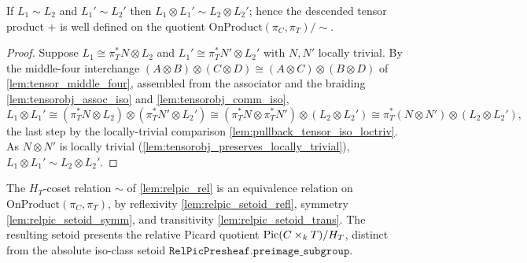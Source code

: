 \begin{lemma}\leanok
  \label{lem:relpic_add_welldef}
  If \(L_1 \sim L_2\) and \(L_1' \sim L_2'\) then
  \(L_1 \otimes L_1' \sim L_2 \otimes L_2'\); hence the descended tensor product
  \(+\) is well defined on the quotient
  \(\mathrm{OnProduct}(\pi_C, \pi_T) / {\sim}\).
\end{lemma}

\begin{proof}
  Suppose \(L_1 \cong \pi_T^* N \otimes L_2\) and
  \(L_1' \cong \pi_T^* N' \otimes L_2'\) with \(N, N'\) locally trivial. By the
  middle-four interchange
  \((A \otimes B) \otimes (C \otimes D) \cong (A \otimes C) \otimes (B \otimes D)\)
  of \cref{lem:tensor_middle_four}, assembled from the associator and the
  braiding \cref{lem:tensorobj_assoc_iso} and \cref{lem:tensorobj_comm_iso},
  \[
    L_1 \otimes L_1'
      \cong (\pi_T^* N \otimes L_2) \otimes (\pi_T^* N' \otimes L_2')
      \cong (\pi_T^* N \otimes \pi_T^* N') \otimes (L_2 \otimes L_2')
      \cong \pi_T^*(N \otimes N') \otimes (L_2 \otimes L_2') ,
  \]
  the last step by the locally-trivial comparison
  \cref{lem:pullback_tensor_iso_loctriv}. As \(N \otimes N'\) is locally
  trivial (\cref{lem:tensorobj_preserves_locally_trivial}),
  \(L_1 \otimes L_1' \sim L_2 \otimes L_2'\).
\leanok
\end{proof}

\begin{definition}\leanok
  \label{lem:relpic_setoid}
  The \(H_T\)-coset relation \(\sim\) of \cref{lem:relpic_rel} is an equivalence
  relation on \(\mathrm{OnProduct}(\pi_C, \pi_T)\), by reflexivity
  \cref{lem:relpic_setoid_refl}, symmetry \cref{lem:relpic_setoid_symm}, and
  transitivity \cref{lem:relpic_setoid_trans}. The resulting setoid presents the
  relative Picard quotient \(\operatorname{Pic}(C \times_k T) / H_T\), distinct from the
  absolute iso-class setoid \(\mathtt{RelPicPresheaf.preimage\_subgroup}\).
\end{definition}

